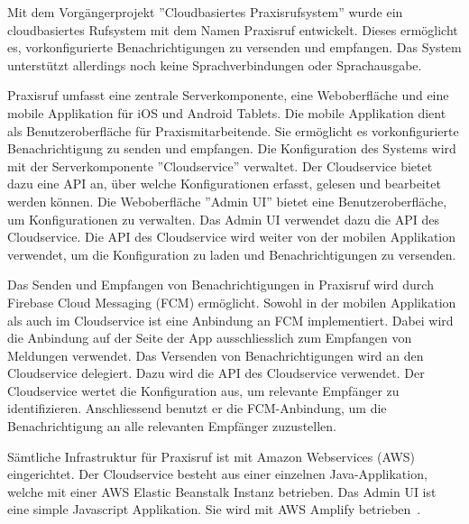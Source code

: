 Mit dem Vorgängerprojekt ''Cloudbasiertes Praxisrufsystem'' wurde ein cloudbasiertes Rufsystem mit dem Namen Praxisruf entwickelt.
Dieses ermöglicht es, vorkonfigurierte Benachrichtigungen zu versenden und empfangen.
Das System unterstützt allerdings noch keine Sprachverbindungen oder Sprachausgabe.

Praxisruf umfasst eine zentrale Serverkomponente, eine Weboberfläche und eine mobile Applikation für iOS und Android Tablets.
Die mobile Applikation dient als Benutzeroberfläche für Praxismitarbeitende.
Sie ermöglicht es vorkonfigurierte Benachrichtigung zu senden und empfangen.
Die Konfiguration des Systems wird mit der Serverkomponente ''Cloudservice'' verwaltet.
Der Cloudservice bietet dazu eine API an, über welche Konfigurationen erfasst, gelesen und bearbeitet werden können.
Die Weboberfläche ''Admin UI'' bietet eine Benutzeroberfläche, um Konfigurationen zu verwalten.
Das Admin UI verwendet dazu die API des Cloudservice.
Die API des Cloudservice wird weiter von der mobilen Applikation verwendet, um die Konfiguration zu laden und Benachrichtigungen zu versenden.

Das Senden und Empfangen von Benachrichtigungen in Praxisruf wird durch Firebase Cloud Messaging (FCM) ermöglicht.
Sowohl in der mobilen Applikation als auch im Cloudservice ist eine Anbindung an FCM implementiert.
Dabei wird die Anbindung auf der Seite der App ausschliesslich zum Empfangen von Meldungen verwendet.
Das Versenden von Benachrichtigungen wird an den Cloudservice delegiert.
Dazu wird die API des Cloudservice verwendet.
Der Cloudservice wertet die Konfiguration aus, um relevante Empfänger zu identifizieren.
Anschliessend benutzt er die FCM-Anbindung, um die Benachrichtigung an alle relevanten Empfänger zuzustellen.

Sämtliche Infrastruktur für Praxisruf ist mit Amazon Webservices (AWS) eingerichtet.
Der Cloudservice besteht aus einer einzelnen Java-Applikation, welche mit einer AWS Elastic Beanstalk Instanz betrieben.
Das Admin UI ist eine simple Javascript Applikation.
Sie wird mit AWS Amplify betrieben~\cite{ip5}.

